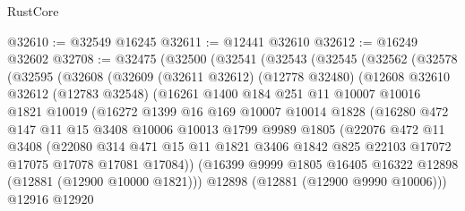 \begin{lexlean}{RustCore}
\begin{coremodule}
@32610 := @32549 @16245
@32611 := @12441 @32610
@32612 := @16249 @32602
@32708 := @32475
    (@32500
      (@32541
        (@32543
          (@32545
            (@32562
              (@32578
                (@32595
                  (@32608
                    (@32609
                      (@32611 @32612)
                      (@12778 @32480)
                      (@12608
                        @32610
                        @32612
                        (@12783 @32548)
                        (@16261
                          @1400
                          @184
                          @251
                          @11
                          @10007
                          @10016
                          @1821
                          @10019
                          (@16272
                            @1399
                            @16
                            @169
                            @10007
                            @10014
                            @1828
                            (@16280
                              @472
                              @147
                              @11
                              @15
                              @3408
                              @10006
                              @10013
                              @1799
                              @9989
                              @1805
                              (@22076
                                @472
                                @11
                                @3408
                                (@22080
                                  @314
                                  @471
                                  @15
                                  @11
                                  @1821
                                  @3406
                                  @1842
                                  @825
                                  @22103
                                  @17072
                                  @17075
                                  @17078
                                  @17081
                                  @17084))
                              (@16399
                                @9999
                                @1805
                                @16405
                                @16322
                                @12898
                                (@12881 (@12900 @10000 @1821)))
                              @12898
                              (@12881 (@12900 @9990 @10006)))
                            @12916
                            @12920

\end{coremodule}
\end{lexlean}
